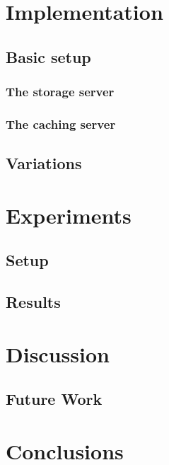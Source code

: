 \documentclass[twoside,openright]{uva-bachelor-thesis}
\begin{document}
\chapter{Implementation}

\section{Basic setup}
\subsection{The storage server}
\subsection{The caching server}
\section{Variations}

\chapter{Experiments}
\section{Setup}
\section{Results}

\chapter{Discussion}
\section{Future Work}
\chapter{Conclusions}


\printbibliography{}
\end{document}
